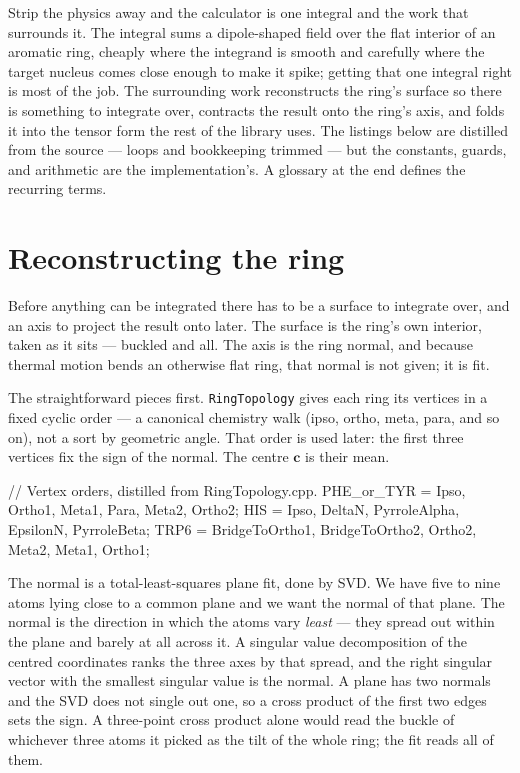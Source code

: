 \documentclass[11pt]{article}
\newcommand{\code}[1]{\texttt{#1}}
\begin{document}

Strip the physics away and the calculator is one integral and the work that surrounds
it. The integral sums a dipole-shaped field over the flat interior of an aromatic ring,
cheaply where the integrand is smooth and carefully where the target nucleus comes close
enough to make it spike; getting that one integral right is most of the job. The
surrounding work reconstructs the ring's surface so there is something to integrate over,
contracts the result onto the ring's axis, and folds it into the tensor form the rest of
the library uses. The listings below are distilled from the source --- loops and
bookkeeping trimmed --- but the constants, guards, and arithmetic are the
implementation's. A glossary at the end defines the recurring terms.

\section{Reconstructing the ring}

Before anything can be integrated there has to be a surface to integrate over, and an
axis to project the result onto later. The surface is the ring's own interior, taken as
it sits --- buckled and all. The axis is the ring normal, and because thermal motion
bends an otherwise flat ring, that normal is not given; it is fit.

The straightforward pieces first. \code{RingTopology} gives each ring its vertices in a fixed cyclic
order --- a canonical chemistry walk (ipso, ortho, meta, para, and so on), not a sort by
geometric angle. That order is used later: the first three vertices fix the sign of the
normal. The centre \(\bm c\) is their mean.

\begin{codebox}
// Vertex orders, distilled from RingTopology.cpp.
PHE_or_TYR = {Ipso, Ortho1, Meta1, Para, Meta2, Ortho2};
HIS        = {Ipso, DeltaN, PyrroleAlpha, EpsilonN, PyrroleBeta};
TRP6       = {BridgeToOrtho1, BridgeToOrtho2, Ortho2, Meta2, Meta1, Ortho1};
\end{codebox}

The normal is a total-least-squares plane fit, done by SVD. We have five to nine atoms
lying close to a common plane and we want the normal of that plane. The normal is the
direction in which the atoms vary \emph{least} --- they spread out within the plane and
barely at all across it. A singular value decomposition of the centred coordinates ranks
the three axes by that spread, and the right singular vector with the smallest singular
value is the normal. A plane has two normals and the SVD does not single out one, so a
cross product of the first two edges sets the sign. A three-point cross product alone
would read the buckle of whichever three atoms it picked as the tilt of the whole ring;
the fit reads all of them.
\end{document}
